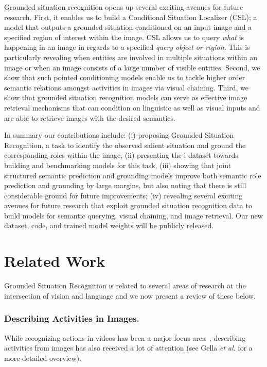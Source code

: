\documentclass[runningheads]{llncs}
\newcommand{\etal}{\textit{et al}.\xspace}
\newcommand{\dataset}{\mbox{\sc{SW}}i\mbox{\sc{G}}\xspace}
\begin{document}
Grounded situation recognition opens up several exciting avenues for future research. First, it enables us to build a Conditional Situation Localizer (CSL); a model that outputs a grounded situation conditioned on an input image and a specified region of interest within the image. CSL allows us to query \emph{what} is happening in an image in regards to a specified \emph{query object or region}. This is particularly revealing when entities are involved in multiple situations within an image or when an image consists of a large number of visible entities. Second, we show that such pointed conditioning models enable us to tackle higher order semantic relations amongst activities in images via visual chaining. Third, we show that grounded situation recognition models can serve as effective image retrieval mechanisms that can condition on linguistic as well as visual inputs and are able to retrieve images with the desired semantics.

In summary our contributions include: (i) proposing Grounded Situation Recognition, a task to identify the observed salient situation and ground the corresponding roles within the image, (ii) presenting the \dataset dataset towards building and benchmarking models for this task, (iii) showing that joint structured semantic prediction and grounding models improve both semantic role prediction and grounding by large margins, but also noting that there is still considerable ground for future improvements; (iv) revealing several exciting avenues for future research that exploit grounded situation recognition data to build models for semantic querying, visual chaining, and image retrieval. Our new dataset, code, and trained model weights will be publicly released.



 \section{Related Work}

Grounded Situation Recognition is related to several areas of research at the intersection of vision and language and we now present a review of these below. 

\vspace{-5mm}
\subsubsection{Describing Activities in Images. }
While recognizing actions in
videos has been a major focus area~\cite{ucf101,KineticsDataset2017,ActivityNet2015,Sigurdsson2016HollywoodIH,Sigurdsson2018CharadesEgoAL}, describing activities from images has also received a lot of attention (see Gella \etal\cite{analysisActionRecogDatasets17} for a more detailed overview).
\end{document}

